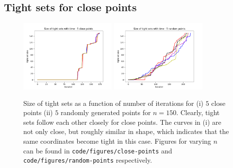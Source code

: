 \documentclass{article}
\begin{document}
\subsection*{Tight sets for close points}

\begin{figure}[H]
    \centering
    \includegraphics[width=0.43\textwidth]{code/figures/close-points/150-5-close-points-tight-sets.png}
    \includegraphics[width=0.43\textwidth]{code/figures/random-points/150-5-random-points-tight-sets.png}
    \caption{Size of tight sets as a function of number of iterations for (i) $5$ close points (ii) $5$ randomly generated points for $n = 150$. Clearly, tight sets follow each other closely for close points. The curves in (i) are not only close, but roughly similar in shape, which indicates that the same coordinates become tight in this case. Figures for varying $n$ can be found in \texttt{code/figures/close-points} and \texttt{code/figures/random-points} respectively.}
    \label{tight-sets-sizes-with-iteration}
\end{figure}
\end{document}
